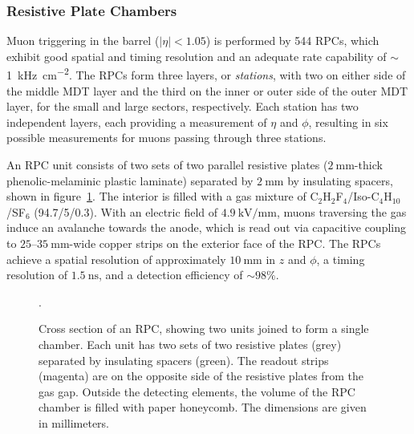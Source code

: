 \subsubsection{Resistive Plate Chambers}
Muon triggering in the barrel ($|\eta|<1.05$) is performed by 544 RPCs, which exhibit good spatial and timing resolution and an adequate rate capability of $\sim$\SI[per-mode=symbol]{1}{\kilo\hertz\per\centi\meter\tothe{2}}. The RPCs form three layers, or \emph{stations}, with two on either side of the middle MDT layer and the third on the inner or outer side of the outer MDT layer, for the small and large sectors, respectively. Each station has two independent layers, each providing a measurement of $\eta$ and $\phi$, resulting in six possible measurements for muons passing through three stations. 

An RPC unit consists of two sets of two parallel resistive plates ($\SI{2}{\milli\meter}$-thick phenolic-melaminic plastic laminate) separated by $\SI{2}{\milli\meter}$ by insulating spacers, shown in figure~\ref{fig:ATLAS-MS-RPC-schematic}. The interior is filled with a gas mixture of C$_2$H$_2$F$_4$/Iso-C$_4$H$_{10}$/SF$_6$ (94.7/5/0.3). With an electric field of $\SI[per-mode=symbol]{4.9}{\kilo\volt\per\milli\meter}$, muons traversing the gas induce an avalanche towards the anode, which is read out via capacitive coupling to $25$--$\SI{35}{\milli\meter}$-wide copper strips on the exterior face of the RPC. The RPCs achieve a spatial resolution of approximately $\SI{10}{\milli\meter}$ in $z$ and $\phi$, a timing resolution of $\SI{1.5}{\nano\second}$, and a detection efficiency of $\sim 98\%$. 

\begin{figure}[htbp]
	\centering
	\caption{Cross section of an RPC, showing two units joined to form a single chamber. Each unit has two sets of two resistive plates (grey) separated by insulating spacers (green). The readout strips (magenta) are on the opposite side of the resistive plates from the gas gap. Outside the detecting elements, the volume of the RPC chamber is filled with paper honeycomb. The dimensions are given in millimeters.}
	\label{fig:ATLAS-MS-RPC-schematic}.
\end{figure}

